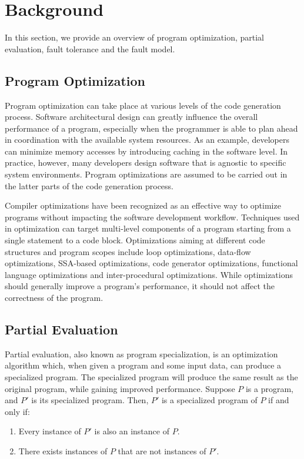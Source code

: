 \section{Background}
\label{sec:background}

In this section, we provide an overview of program optimization, partial evaluation, fault tolerance and the fault model.

\subsection{Program Optimization}
Program optimization can take place at various levels of the code generation process.
Software architectural design can greatly influence the overall performance of a program, especially when the programmer is able to plan ahead in coordination with the available system resources.
As an example, developers can minimize memory accesses by introducing caching in the software level.
In practice, however, many developers design software that is agnostic to specific system environments.
Program optimizations are assumed to be carried out in the latter parts of the code generation process. 

Compiler optimizations have been recognized as an effective way to optimize programs without impacting the software development workflow.
Techniques used in optimization can target multi-level components of a program starting from a single statement to a code block. 
Optimizations aiming at different code structures and program scopes include loop optimizations, data-flow optimizations, SSA-based optimizations, code generator optimizations, functional language optimizations and inter-procedural optimizations. While optimizations should generally improve a program's performance, it should not affect the correctness of the program.

\subsection{Partial Evaluation}
Partial evaluation, also known as program specialization, is an optimization algorithm which, when given a program and some input data, can produce a specialized program. The specialized program will produce the same result as the original program, while gaining improved performance. Suppose $P$ is a program, and $P'$ is its specialized program. Then, $P'$ is a specialized program of $P$ if and only if:
\begin{enumerate}
\item Every instance of $P'$ is also an instance of $P$.
\item There exists instances of $P$ that are not instances of $P'$.
\end{enumerate}

